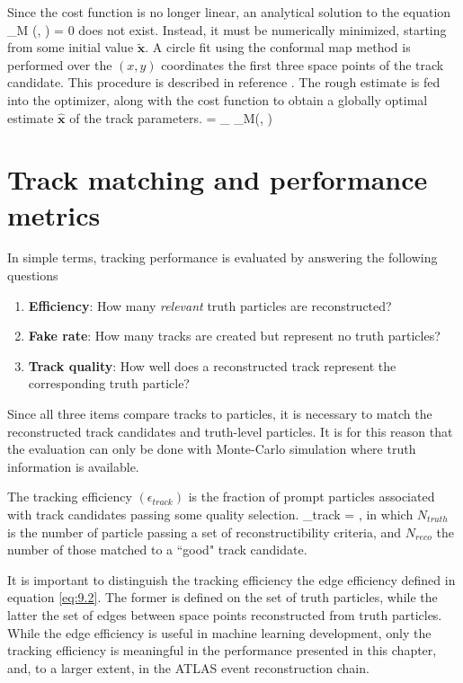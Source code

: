 Since the cost function is no longer linear, an analytical solution to the equation 
\beq
\label{eq:track-performance:4-1}
\nabla{}_M (, {\vartheta}) = 0
\eeq
does not exist.
Instead, it must be numerically minimized, starting from some initial value $\tilde{\mathbf{x}}$.
A circle fit using the conformal map method is performed over the $(x,y)$ coordinates the first three space points of the track candidate. 
This procedure is described in reference \cite{HANSROUL1988498}. 
The rough estimate is fed into the optimizer, along with the cost function to obtain a globally optimal estimate $\hat{\mathbf{x}}$ of the track parameters. 
\beq
\label{eq:track-performance:6}
 = \min_{} _M(, \vartheta)
\eeq


\section{Track matching and performance metrics}
\label{sect:track-match-metrics}

In simple terms, tracking performance is evaluated by answering the following questions
\begin{enumerate}
    \item \textbf{Efficiency}: How many \textit{relevant} truth particles are reconstructed?
    \item \textbf{Fake rate}: How many tracks are created but represent no truth particles?
    \item \textbf{Track quality}: How well does a reconstructed track represent the corresponding truth particle?
\end{enumerate}
Since all three items compare tracks to particles, it is necessary to match the reconstructed track candidates and truth-level particles. 
It is for this reason that the evaluation can only be done with Monte-Carlo simulation where truth information is available. 

\begin{definition}
    \label{def:tracking-efficiency}
    The tracking efficiency $(\epsilon_{track})$ is the fraction of prompt particles associated with track candidates passing some quality selection. 
    \beq \label{eq:track-performance:7}
    \epsilon_{track} = ,
    \eeq
    in which $N_{truth}$ is the number of particle passing a set of reconstructibility criteria, and $N_{reco}$ the number of those matched to a ``good" track candidate.
\end{definition}
It is important to distinguish the tracking efficiency the edge efficiency defined in equation \eqref{eq:9.2}. 
The former is defined on the set of truth particles, while the latter the set of edges between space points reconstructed from truth particles. 
While the edge efficiency is useful in machine learning development, only the tracking efficiency is meaningful in the performance presented in this chapter, and, to a larger extent, in the ATLAS event reconstruction chain.

